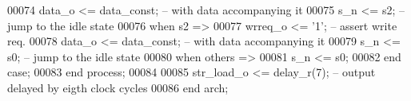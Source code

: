 \begin{DoxyCode}
00074                 \textcolor{vhdlchar}{data_o}  \textcolor{vhdlchar}{<=} \textcolor{vhdlchar}{data_const};\textcolor{keyword}{  -- with data accompanying it}
00075                 \textcolor{vhdlchar}{s_n}     \textcolor{vhdlchar}{<=} \textcolor{vhdlchar}{s2};\textcolor{keyword}{      -- jump to the idle state}
00076             \textcolor{keywordflow}{when} \textcolor{vhdlchar}{s2} \textcolor{vhdlchar}{=}\textcolor{vhdlchar}{>}
00077                 \textcolor{vhdlchar}{wrreq_o}  \textcolor{vhdlchar}{<=} \textcolor{vhdlchar}{'}\textcolor{vhdllogic}{}\textcolor{vhdllogic}{1}\textcolor{vhdlchar}{'};\textcolor{keyword}{            -- assert write req.}
00078                 \textcolor{vhdlchar}{data_o}  \textcolor{vhdlchar}{<=} \textcolor{vhdlchar}{data_const};\textcolor{keyword}{  -- with data accompanying it}
00079                 \textcolor{vhdlchar}{s_n}     \textcolor{vhdlchar}{<=} \textcolor{vhdlchar}{s0};\textcolor{keyword}{      -- jump to the idle state}
00080             \textcolor{keywordflow}{when} \textcolor{keywordflow}{others} \textcolor{vhdlchar}{=}\textcolor{vhdlchar}{>}
00081                 \textcolor{vhdlchar}{s_n} \textcolor{vhdlchar}{<=} \textcolor{vhdlchar}{s0};
00082         \textcolor{keywordflow}{end} \textcolor{keywordflow}{case};
00083     \textcolor{keywordflow}{end} \textcolor{keywordflow}{process};
00084 
00085     \textcolor{vhdlchar}{str_load_o} \textcolor{vhdlchar}{<=} \textcolor{vhdlchar}{delay_r}\textcolor{vhdlchar}{(}\textcolor{vhdllogic}{}\textcolor{vhdllogic}{7}\textcolor{vhdlchar}{)};\textcolor{keyword}{   -- output delayed by eigth clock cycles}
00086 \textcolor{keywordflow}{end} \textcolor{vhdlchar}{arch};
\end{DoxyCode}
